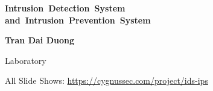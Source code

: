 \begin{frame}[plain]
  \vfill
  \begin{minipage}{0.92\textwidth}
    {\color{TitleColor}\fontsize{23}{28}\selectfont\bfseries
      \mbox{Intrusion Detection System}\\
      \mbox{and Intrusion Prevention System}\par}
    \vspace{0.48cm}
    {\color{ResearchColor}\fontsize{19}{23}\selectfont\bfseries Tran Dai Duong\par}
    \vspace{0.16cm}
    {\color{SecondaryColor}\fontsize{17}{21}\selectfont Laboratory\par}
  \end{minipage}
  \vfill
  {\color{SecondaryColor}\fontsize{12}{15}\selectfont All Slide Shows: \url{https://cygnussec.com/project/ids-ips}\par}
\end{frame}

